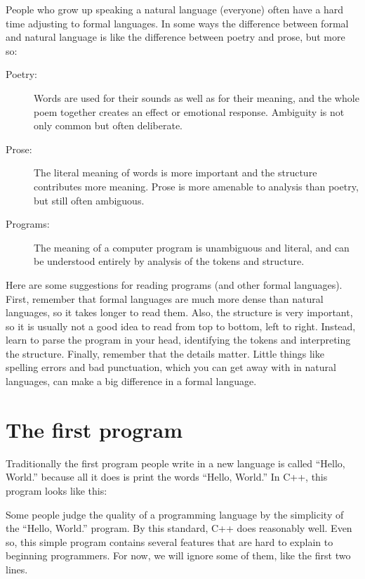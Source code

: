 People who grow up speaking a natural language (everyone) often have a
hard time adjusting to formal languages.  In some ways the difference
between formal and natural language is like the difference between
poetry and prose, but more so:


\begin{description}

\item[Poetry:] Words are used for their sounds as well as for
their meaning, and the whole poem together creates an effect or
emotional response.  Ambiguity is not only common but often
deliberate.

\item[Prose:] The literal meaning of words is more important
and the structure contributes more meaning.  Prose is more amenable to
analysis than poetry, but still often ambiguous.

\item[Programs:] The meaning of a computer program is unambiguous
and literal, and can be understood entirely by analysis of the
tokens and structure.

\end{description}

Here are some suggestions for reading programs (and other formal
languages).  First, remember that formal languages are much more dense
than natural languages, so it takes longer to read them.  Also, the
structure is very important, so it is usually not a good idea to read
from top to bottom, left to right.  Instead, learn to parse the
program in your head, identifying the tokens and interpreting the
structure.  Finally, remember that the details matter.  Little things
like spelling errors and bad punctuation, which you can get away
with in natural languages, can make a big difference in a formal
language.

\section{The first program}
\label{hello}

Traditionally the first program people write in a new language
is called ``Hello, World.'' because all it does is print the
words ``Hello, World.''  In C++, this program looks like this:


%
Some people judge the quality of a programming language by
the simplicity of the ``Hello, World.'' program.  By this
standard, C++ does reasonably well.  Even so, this simple
program contains several features that are hard to explain to
beginning programmers.  For now, we will ignore some of
them, like the first two lines.

